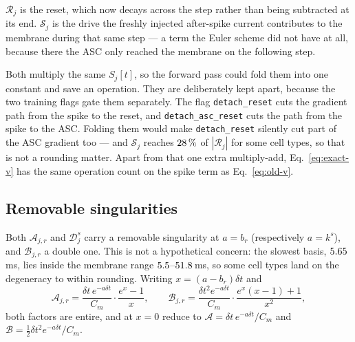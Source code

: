 \documentclass[11pt,a4paper,numbers=noenddot]{scrartcl}
\newcommand{\dt}{\delta t}
\newcommand{\Acoef}{\mathcal{A}}
\newcommand{\Bcoef}{\mathcal{B}}
\newcommand{\Dcoef}{\mathcal{D}}
\newcommand{\Rcoef}{\mathcal{R}}
\newcommand{\Scoef}{\mathcal{S}}
\newcommand{\code}[1]{\texttt{\small #1}}
\begin{document}
$\Rcoef_j$ is the reset, which now decays across the step rather than being
subtracted at its end. $\Scoef_j$ is the drive the freshly injected after-spike
current contributes to the membrane during that same step --- a term the
Euler scheme did not have at all, because there the ASC only reached the
membrane on the following step.

Both multiply the same $S_j[t]$, so the forward pass could fold them into one
constant and save an operation. They are deliberately kept apart, because
the two training flags gate them separately. The flag \code{detach\_reset}
cuts the gradient path from the spike to the reset, and
\code{detach\_asc\_reset} cuts the path from the spike to the ASC. Folding them would make \code{detach\_reset} silently cut
part of the ASC gradient too --- and $\Scoef_j$ reaches $28\,\%$ of
$|\Rcoef_j|$ for some cell types, so that is not a rounding matter. Apart from
that one extra multiply-add, Eq.~\eqref{eq:exact-v} has the same operation
count on the spike term as Eq.~\eqref{eq:old-v}.

\subsection{Removable singularities}

Both $\Acoef_{j,r}$ and $\Dcoef^{s}_j$ carry a removable singularity at
$a = b_r$ (respectively $a = k^{s}$), and $\Bcoef_{j,r}$ a double one. This
is not a hypothetical concern: the slowest basis, $5.65\,$ms, lies
inside the membrane range $5.5$--$51.8\,$ms, so some cell types
land on the degeneracy to within rounding. Writing $x = (a-b_r)\dt$ and
%
\begin{equation}
\label{eq:stable}
\Acoef_{j,r} = \frac{\dt\, e^{-a\dt}}{C_m}\cdot\frac{e^{x}-1}{x},
\qquad
\Bcoef_{j,r} = \frac{\dt^{2} e^{-a\dt}}{C_m}\cdot
  \frac{e^{x}(x-1)+1}{x^{2}},
\end{equation}
%
both factors are entire, and at $x = 0$ reduce to
$\Acoef = \dt\,e^{-a\dt}/C_m$ and $\Bcoef = \tfrac12 \dt^{2}e^{-a\dt}/C_m$.
\end{document}
